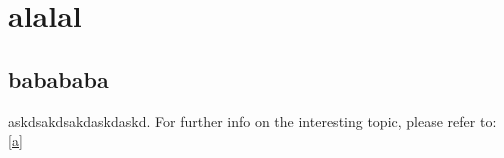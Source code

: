 % 
%





\setlength{\parindent}{0pt}

\usepackage{epigraph}
\usepackage{tocloft}
\usepackage{hyperref}
\usepackage{nameref} 
\usepackage{zref-xr}




\chapter{alalal}
\section{babababa}
askdsakdsakdaskdaskd. For further info on the interesting topic, please refer to: \ref{a} 

